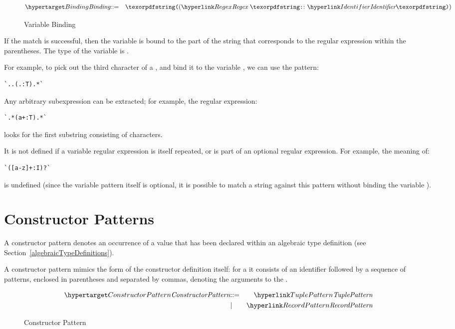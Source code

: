 \begin{figure}[htbp]
\begin{eqnarray*}
\ntDef{Binding}&\arrow&\q{(}\ntRef{Regex}\ \q{:}\ \ntRef{Identifier}\q{)}
\end{eqnarray*}
\caption{Variable Binding}
\label{ergexpBindingFig}
\end{figure}

If the match is successful, then the variable is bound to the part of the string that corresponds to the regular expression within the parentheses. The type of the variable is .

For example, to pick out the third character of a , and bind it to the variable , we can use the pattern:
\begin{lstlisting}
`..(.:T).*`
\end{lstlisting}
Any arbitrary subexpression can be extracted; for example, the regular expression:
\begin{lstlisting}
`.*(a+:T).*`
\end{lstlisting}
looks for the first substring consisting of  characters.
\begin{aside}
It is not defined if a variable regular expression is itself repeated, or is part of an optional regular expression. For example, the meaning of:
\begin{lstlisting}
`([a-z]+:I)?`
\end{lstlisting}
is undefined (since the variable pattern itself is optional, it is possible to match a string against this pattern without binding the variable ).
\end{aside}

\section{Constructor Patterns}
\label{tuplePattern}
A constructor pattern denotes an occurrence of a value that has been declared within an algebraic type definition (see Section~\vref{algebraicTypeDefinitions}). 

A constructor pattern mimics the form of the constructor definition itself: for a  it consists of an identifier followed by a sequence of patterns, enclosed in parentheses and separated by commas, denoting the arguments to the .

\begin{figure}[htbp]
\begin{eqnarray*}
\ntDef{ConstructorPattern}&\arrow&\ntRef{TuplePattern}\\
&\choice&\ntRef{RecordPattern}
\end{eqnarray*}
\caption{Constructor Pattern}
\label{constructorPtnFig}
\end{figure}


